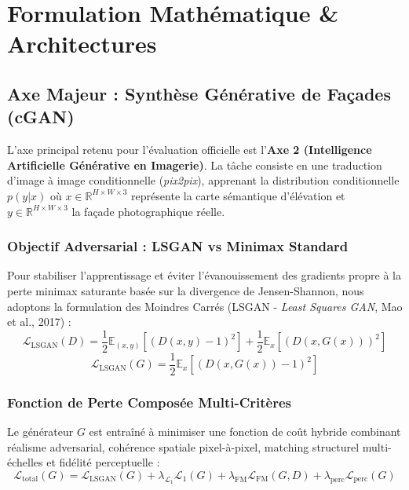 \documentclass[11pt,a4paper]{report}
\begin{document}
\chapter{Formulation Mathématique \& Architectures}

\section{Axe Majeur : Synthèse Générative de Façades (cGAN)}
L'axe principal retenu pour l'évaluation officielle est l'\textbf{Axe 2 (Intelligence Artificielle Générative en Imagerie)}. La tâche consiste en une traduction d'image à image conditionnelle (\emph{pix2pix}), apprenant la distribution conditionnelle $p(y|x)$ où $x \in \mathbb{R}^{H \times W \times 3}$ représente la carte sémantique d'élévation et $y \in \mathbb{R}^{H \times W \times 3}$ la façade photographique réelle.

\subsection{Objectif Adversarial : LSGAN vs Minimax Standard}
Pour stabiliser l'apprentissage et éviter l'évanouissement des gradients propre à la perte minimax saturante basée sur la divergence de Jensen-Shannon, nous adoptons la formulation des Moindres Carrés (LSGAN - \emph{Least Squares GAN}, Mao et al., 2017) :
\begin{equation}
    \mathcal{L}_{\text{LSGAN}}(D) = \frac{1}{2} \mathbb{E}_{(x, y)} \left[ (D(x, y) - 1)^2 \right] + \frac{1}{2} \mathbb{E}_{x} \left[ (D(x, G(x)))^2 \right]
\end{equation}
\begin{equation}
    \mathcal{L}_{\text{LSGAN}}(G) = \frac{1}{2} \mathbb{E}_{x} \left[ (D(x, G(x)) - 1)^2 \right]
\end{equation}

\subsection{Fonction de Perte Composée Multi-Critères}
Le générateur $G$ est entraîné à minimiser une fonction de coût hybride combinant réalisme adversarial, cohérence spatiale pixel-à-pixel, matching structurel multi-échelles et fidélité perceptuelle :
\begin{equation}
    \mathcal{L}_{\text{total}}(G) = \mathcal{L}_{\text{LSGAN}}(G) + \lambda_{\mathcal{L}_1} \mathcal{L}_1(G) + \lambda_{\text{FM}} \mathcal{L}_{\text{FM}}(G, D) + \lambda_{\text{perc}} \mathcal{L}_{\text{perc}}(G)
\end{equation}
\end{document}
